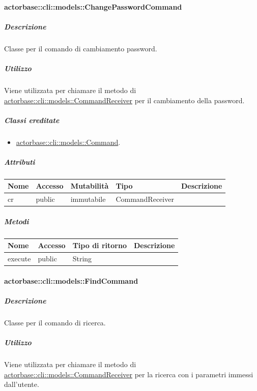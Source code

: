 \documentclass{scalatekids-article}
\begin{document}
\paragraph{actorbase::cli::models::ChangePasswordCommand}
\label{sec:actorbase::cli::models::ChangePasswordCommand}

\subparagraph{Descrizione}

Classe per il comando di cambiamento password.

\subparagraph{Utilizzo}

Viene utilizzata per chiamare il metodo di
\hyperref[sec:actorbase::cli::models::CommandReceiver]{actorbase::cli::models::CommandReceiver} per il cambiamento della password.

\subparagraph{Classi ereditate}

\begin{itemize}
\item \hyperref[sec:actorbase::cli::models::Command]{actorbase::cli::models::Command}.
\end{itemize}

\subparagraph{Attributi}

\begin{tabular}{| l | l | l | l | l |}
  \hline
  Nome & Accesso & Mutabilità & Tipo & Descrizione\\
  \hline
  cr & public & immutabile & CommandReceiver & \\
  \hline
\end{tabular}

\subparagraph{Metodi}

\begin{tabular}{| l | l | l | l |}
  \hline
  Nome & Accesso & Tipo di ritorno & Descrizione\\
  \hline
  execute & public & String & \\
  \hline
\end{tabular}


\paragraph{actorbase::cli::models::FindCommand}
\label{sec:actorbase::cli::models::FindCommand}

\subparagraph{Descrizione}

Classe per il comando di ricerca.

\subparagraph{Utilizzo}

Viene utilizzata per chiamare il metodo di
\hyperref[sec:actorbase::cli::models::CommandReceiver]{actorbase::cli::models::CommandReceiver} per la ricerca con i parametri immessi
dall'utente.
\end{document}
